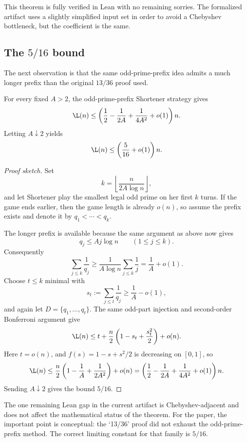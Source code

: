 \begin{remark}
This theorem is fully verified in Lean with no remaining sorries.  The
formalized artifact uses a slightly simplified input set in order to avoid a
Chebyshev bottleneck, but the coefficient is the same.
\end{remark}

\subsection{The \texorpdfstring{$5/16$}{5/16} bound}

The next observation is that the same odd-prime-prefix idea admits a much longer
prefix than the original $13/36$ proof used.

\begin{theorem}\label{thm:516}
For every fixed $A>2$, the odd-prime-prefix Shortener strategy gives
\[
  \L(n) \le
  \left(
    \frac12 - \frac{1}{2A} + \frac{1}{4A^2} + o(1)
  \right)n.
\]
Letting $A \downarrow 2$ yields
\[
  \L(n) \le \left(\frac{5}{16}+o(1)\right)n.
\]
\end{theorem}

\begin{proof}[Proof sketch]
Set
\[
  k = \left\lfloor \frac{n}{2A\log n}\right\rfloor,
\]
and let Shortener play the smallest legal odd prime on her first $k$ turns.
If the game ends earlier, then the game length is already $o(n)$, so assume the
prefix exists and denote it by $q_1<\cdots<q_k$.

The longer prefix is available because the same argument as above now gives
\[
  q_j \le A j \log n \qquad (1\le j\le k).
\]
Consequently
\[
  \sum_{j\le k}\frac1{q_j}
  \ge
  \frac{1}{A\log n}\sum_{j\le k}\frac1j
  =
  \frac1A+o(1).
\]
Choose $t\le k$ minimal with
\[
  s_t := \sum_{j\le t}\frac1{q_j} \ge \frac1A-o(1),
\]
and again let $D=\{q_1,\dots,q_t\}$.  The same odd-part injection and
second-order Bonferroni argument give
\[
  \L(n) \le t + \frac n2\left(1-s_t+\frac{s_t^2}{2}\right) + o(n).
\]
Here $t=o(n)$, and $f(s)=1-s+s^2/2$ is decreasing on $[0,1]$, so
\[
  \L(n) \le
  \frac n2\left(1-\frac1A+\frac{1}{2A^2}\right)+o(n)
  =
  \left(\frac12 - \frac{1}{2A} + \frac{1}{4A^2} + o(1)\right)n.
\]
Sending $A\downarrow 2$ gives the bound $5/16$.
\end{proof}

\begin{remark}
The one remaining Lean gap in the current artifact is Chebyshev-adjacent and
does not affect the mathematical status of the theorem.  For the paper, the
important point is conceptual: the `13/36' proof did not exhaust the
odd-prime-prefix method.  The correct limiting constant for that family is
$5/16$.
\end{remark}

